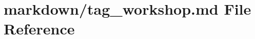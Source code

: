 \hypertarget{tag__workshop_8md}{}\section{markdown/tag\+\_\+workshop.md File Reference}
\label{tag__workshop_8md}
